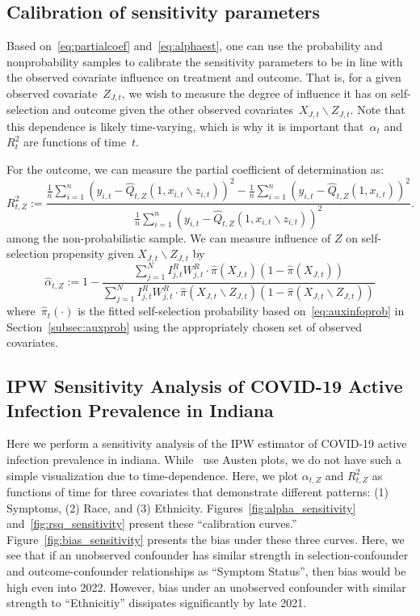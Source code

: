 \documentclass[11pt]{amsart}
\numberwithin{equation}{section}
\theoremstyle{plain}
\begin{document}
\subsection{Calibration of sensitivity parameters}

Based on~\eqref{eq:partialcoef} and~\eqref{eq:alphaest}, one can use the probability and nonprobability samples to calibrate the sensitivity parameters to be in line with the observed covariate influence on treatment and outcome.  That is, for a given observed covariate~$Z_{J,t}$, we wish to measure the degree of influence it has on self-selection and outcome given the other observed covariates~$X_{J,t} \backslash Z_{J,t}$.  Note that this dependence is likely time-varying, which is why it is important that~$\alpha_t$ and~$R_t^2$ are functions of time~$t$.

For the outcome, we can measure the partial coefficient of determination as:
$$
R_{t, Z}^2 := \frac{\frac{1}{n} \sum_{i=1}^n (y_{i,t} - \hat Q_{t,Z} (1, x_{i,t} \backslash z_{i,t}) )^2 - \frac{1}{n} \sum_{i=1}^n (y_{i,t} - \hat Q_{t,Z} (1, x_{i,t}) )^2}{\frac{1}{n} \sum_{i=1}^n (y_{i,t} - \hat Q_{t,Z} (1, x_{i,t} \backslash z_{i,t}) )^2}.
$$
among the non-probabilistic sample.  We can measure influence of $Z$ on self-selection propensity given $X_{J,t} \backslash Z_{J,t}$ by
$$
\hat \alpha_{t, Z} := 1 - \frac{\sum_{j=1}^N I_{j,t}^R W_{j,t}^R \cdot \hat \pi(X_{J,t}) (1- \hat \pi(X_{J,t}))}{\sum_{j=1}^N I_{j,t}^R W_{j,t}^R \cdot \hat \pi(X_{J,t} \backslash Z_{J,t}) (1- \hat \pi(X_{J,t} \backslash Z_{J,t}))}
$$
where~$\hat \pi_t (\cdot)$ is the fitted self-selection probability based on~\eqref{eq:auxinfoprob} in Section~\ref{subsec:auxprob} using the appropriately chosen set of observed covariates.

\subsection{IPW Sensitivity Analysis of COVID-19 Active Infection Prevalence in Indiana}

Here we perform a sensitivity analysis of the IPW estimator of COVID-19 active infection prevalence in indiana.  While~\cite{Veitch2020} use Austen plots, we do not have such a simple visualization due to time-dependence.  Here, we plot  $\alpha_{t,Z}$ and $R^2_{t,Z}$ as functions of time for three covariates that demonstrate different patterns: (1) Symptoms, (2) Race, and (3) Ethnicity.  Figures~\ref{fig:alpha_sensitivity} and~\ref{fig:rsq_sensitivity} present these ``calibration curves.'' Figure~\ref{fig:bias_sensitivity} presents the bias under these three curves.  Here, we see that if an unobserved confounder has similar strength in selection-confounder and outcome-confounder relationships as ``Symptom Status'', then bias would be high even into 2022.  However, bias under an unobserved confounder with similar strength to ``Ethnicitiy'' dissipates significantly by late 2021.
\end{document}
